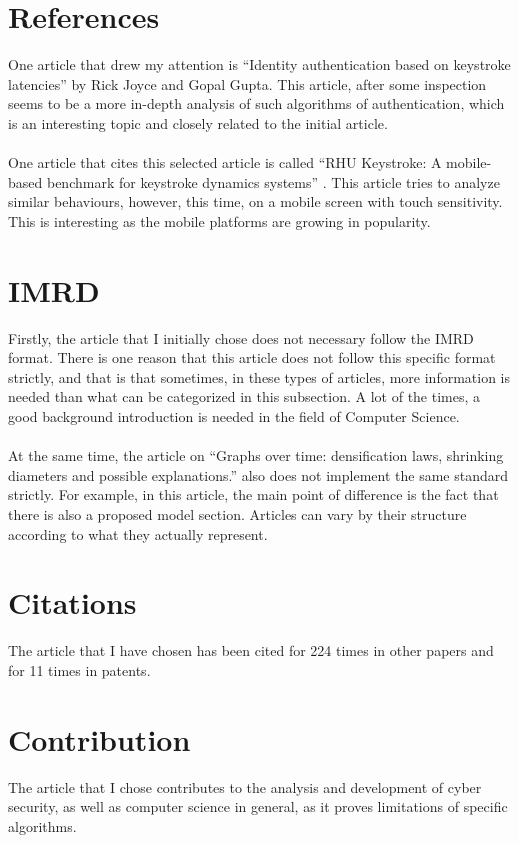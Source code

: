 \documentclass[english]{report}
\begin{document}
\section{References}

One article that drew my attention is ``Identity authentication based on keystroke latencies'' by Rick Joyce and Gopal Gupta. This article, after some inspection seems to be a more in-depth analysis of such algorithms of authentication, which is an interesting topic and closely related to the initial article. \cite{reference1}
\\\\
One article that cites this selected article is called ``RHU Keystroke: A mobile-based benchmark for keystroke dynamics systems'' \cite{reference2}. This article tries to analyze similar behaviours, however, this time, on a mobile screen with touch sensitivity. This is interesting as the mobile platforms are growing in popularity.

\section{IMRD}

Firstly, the article that I initially chose does not necessary follow the IMRD format. There is one reason that this article does not follow this specific format strictly, and that is that sometimes, in these types of articles, more information is needed than what can be categorized in this subsection. A lot of the times, a good background introduction is needed in the field of Computer Science.
\\\\
At the same time, the article on ``Graphs over time: densification laws, shrinking diameters and possible explanations.'' also does not implement the same standard strictly. For example, in this article, the main point of difference is the fact that there is also a proposed model section. Articles can vary by their structure according to what they actually represent.

\section{Citations}

The article that I have chosen has been cited for 224 times in other papers and for 11 times in patents.

\section{Contribution}

The article that I chose contributes to the analysis and development of cyber security, as well as computer science in general, as it proves limitations of specific algorithms.



\renewcommand{\bibname}{References}

\end{document}
